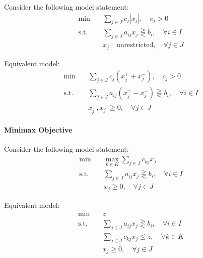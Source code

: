                 Consider the following model statement:
                \begin{align*}
                    \min \quad & \sum_{j\in J}c_j|x_j|, \quad c_j > 0 \\
                    \text{s.t.} \quad & \sum_{j\in J}a_{ij}x_j \gtreqless b_i, \quad \forall i\in I \\
                                      & x_j \quad \text{unrestricted}, \quad \forall j\in J 
                \end{align*}

                
                Equivalent model:
                \begin{align*}
                    \min \quad & \sum_{j\in J}c_j(x_j^+ + x_j^-), \quad c_j > 0 \\
                    \text{s.t.} \quad & \sum_{j\in J}a_{ij}(x_j^+ - x_j^-) \gtreqless b_i, \quad \forall i\in I \\
                                      & x_j^+, x_j^- \ge 0, \quad \forall j\in J 
                \end{align*}
            
            \paragraph{Minimax Objective}
                
                Consider the following model statement:
                \begin{align*}
                    \min \quad & \max_{k\in K}\sum_{j\in J}c_{kj}x_j \\
                    \text{s.t.} \quad & \sum_{j\in J}a_{ij}x_j \gtreqless b_i, \quad \forall i\in I \\
                                      & x_j \ge 0, \quad \forall j\in J 
                \end{align*}
                
                Equivalent model:
                \begin{align*}
                    \min \quad & z \\
                    \text{s.t.} \quad & \sum_{j\in J}a_{ij}x_j \gtreqless b_i, \quad \forall i\in I \\
                                      & \sum_{j\in J}c_{kj}x_j \le z, \quad \forall k\in K \\
                                      & x_j \ge 0, \quad \forall j\in J 
                \end{align*}
            
